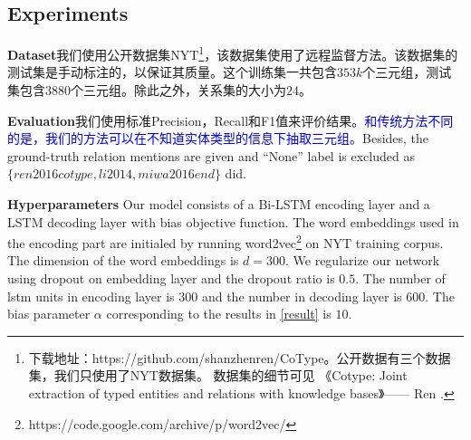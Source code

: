 \documentclass[a4paper,UTF8,no-math]{ctexart}
\begin{document}
\subsection{Experiments}

\noindent\textbf{Dataset}我们使用公开数据集NYT\footnote{下载地址：https://github.com/shanzhenren/CoType。公开数据有三个数据集，我们只使用了NYT数据集。
	数据集的细节可见 《Cotype: Joint extraction of typed entities and relations with knowledge bases》——  Ren .
}，该数据集使用了远程监督方法。该数据集的测试集是手动标注的，以保证其质量。这个训练集一共包含$ 353k $个三元组，测试集包含$ 3880 $个三元组。除此之外，关系集的大小为$ 24 $。

\noindent\textbf{Evaluation}我们使用标准Precision，Recall和F1值来评价结果。\textcolor{blue}{和传统方法不同的是，我们的方法可以在不知道实体类型的信息下抽取三元组。}Besides, the ground-truth relation mentions are given and ``None'' label is excluded as $ \{ren2016cotype,li2014,miwa2016end\} $ did.

\noindent\textbf{Hyperparameters}
Our model consists of a Bi-LSTM encoding layer and a LSTM decoding layer with bias objective function.
The word embeddings used in the encoding part are initialed by running word2vec\footnote{https://code.google.com/archive/p/word2vec/} on NYT training corpus.
The dimension of the word embeddings is $d=300$. We regularize our network using
dropout on embedding layer and the dropout ratio is $0.5$.
The number of lstm units in encoding layer is $300$ and the number in decoding layer is $600$.
The bias parameter $\alpha$ corresponding to the results in  \autoref{result} is $10$.
\end{document}
